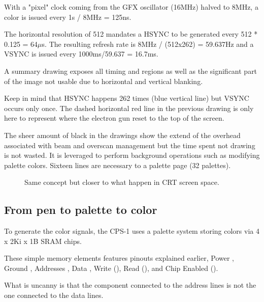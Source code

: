 With a "pixel" clock coming from the GFX oscillator (16MHz) halved to 8MHz, a color is issued every 1s / 8MHz = 125ns.

The horizontal resolution of 512 mandates a HSYNC to be generated every 512 * 0.125 = 64$\mu$s. The resulting refresh rate is 8MHz / (512x262) = 59.637Hz and a VSYNC is issued every 1000ms/59.637 = 16.7ms.


A summary drawing exposes all timing and regions as well as the significant part of the image not usable due to horizontal and vertical blanking.






Keep in mind that HSYNC happens 262 times (blue vertical line) but VSYNC occurs only once. The dashed horizontal red line in the previous drawing is only here to represent where the electron gun reset to the top of the screen.

The sheer amount of black in the drawings show the extend of the overhead associated with beam and overscan management but the time spent not drawing is not wasted. It is leveraged to perform background operations such as modifying palette colors. Sixteen lines are necessary to a palette page (32 palettes).

\begin{figure}[H]
\caption*{Same concept but closer to what happen in CRT screen space.}
\end{figure}


\subsection{From pen to palette to color}

To generate the color signals, the CPS-1 uses a palette system storing colors via 4 x 2Ki x 1B  SRAM chips.


These simple memory elements features pinouts explained earlier, Power , Ground , Addresses , Data , Write (), Read (), and Chip Enabled ().

What is uncanny is that the component connected to the address lines is not the one connected to the data lines.

